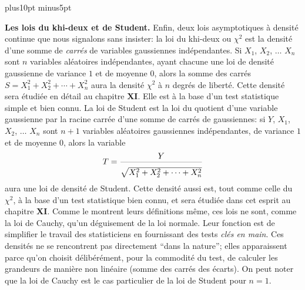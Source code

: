 \vskip12pt plus10pt minus5pt
 
{\bf Les lois du khi-deux et de Student.} 
\medskip 
Enfin, deux lois asymptotiques \`a densit\'e continue que nous signalons  
sans insister: la loi du khi-deux ou $\chi^2$ est la densit\'e d'une somme 
de {\it carr\'es} de variables gaussiennes ind\'ependantes. Si $X_1$,  
$X_2$, $\ldots$ $X_n$ sont $n$ variables al\'eatoires ind\'ependantes, 
ayant chacune une loi de densit\'e gaussienne de variance $1$ et de 
moyenne  $0$, alors la somme des carr\'es $S = X_1^2 + X_2^2 + \cdots + 
X_n^2$ aura la densit\'e $\chi^2$ \`a $n$ degr\'es de libert\'e. Cette 
densit\'e sera \'etudi\'ee en d\'etail au chapitre {\bf XI}. Elle est \`a la 
base d'un test statistique simple et bien connu.  
\medskip 
La loi de Student est la loi du quotient d'une variable gaussienne par la 
racine carr\'ee d'une somme de carr\'es de gaussiennes: si $Y$, $X_1$,  
$X_2$, $\ldots$ $X_n$ sont $n+1$ variables al\'eatoires gaussiennes 
ind\'ependantes, de variance $1$ et de moyenne $0$, alors la variable 
$$T = {Y \over \sdown{15}\sqrt{X_1^2 + X_2^2 + \cdots + X_n^2} }$$ 
aura une loi de densit\'e de Student. Cette densit\'e aussi est, tout  
comme celle du $\chi^2$, \`a la base d'un test statistique bien connu, et 
sera \'etudi\'ee dans cet esprit au chapitre {\bf XI}. 
\medskip 
Comme le montrent leurs d\'efinitions m\^eme, ces lois ne sont, comme  
la loi de Cauchy, qu'un d\'eguisement de la loi normale. Leur fonction  est 
de simplifier le travail des statisticiens en fournissant des tests {\it 
cl\'es en main}. Ces densit\'es ne se rencontrent pas directement ``dans 
la nature''; elles apparaissent parce qu'on choisit d\'elib\'er\'ement, 
pour la commodit\'e du test, de calculer les grandeurs de mani\`ere 
non lin\'eaire (somme des carr\'es des \'ecarts). 
\medskip 
On peut noter que la loi de Cauchy est le cas particulier 
de la loi de Student pour $n=1$. 
 
 
 
 
 
\bye 
 
